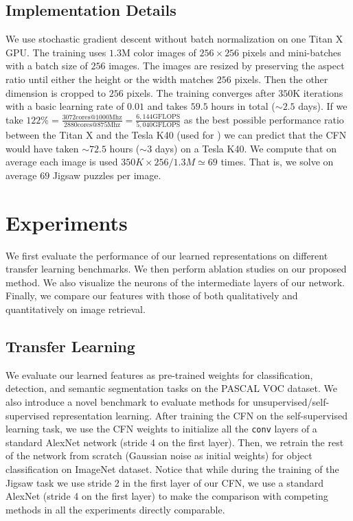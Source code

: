 \documentclass[runningheads]{llncs}
\begin{document}
\subsection{Implementation Details}

We use stochastic gradient descent without batch normalization \cite{batch_normalization} on one Titan X GPU. The training uses $1.3$M color images of $256\times 256$ pixels and mini-batches with a batch size of $256$ images. The images are resized by preserving the aspect ratio until either the height or the width matches $256$ pixels. Then the other dimension is cropped to $256$ pixels. The training converges after $350$K iterations with a basic learning rate of $0.01$ and takes $59.5$ hours in total ($\sim 2.5$ days). If we take $122\%= \frac{3072\text{cores}@1000\text{Mhz}}{2880 \text{cores} @875\text{Mhz}}=\frac{6,144\text{GFLOPS}}{5,040\text{GFLOPS}}$ as the best possible performance ratio between the Titan X and the Tesla K40 (used for \cite{Carl2015}) we can predict that the CFN would have taken $\sim 72.5$ hours ($\sim 3$ days) on a Tesla K40.
We compute that on average each image is used $350K \times 256 / 1.3M \simeq 69$ times. That is, we solve on average $69$ Jigsaw puzzles per image.


\section{Experiments}
We first evaluate the performance of our learned representations on different transfer learning benchmarks. We then perform ablation studies on our proposed method. We also visualize the neurons of the intermediate layers of our network. Finally, we compare our features with those of \cite{Carl2015,Gupta15} both qualitatively and quantitatively on image retrieval.

\subsection{Transfer Learning}
We evaluate our learned features as pre-trained weights for classification, detection, and semantic segmentation tasks on the PASCAL VOC dataset\cite{voc}.
We also introduce a novel benchmark to evaluate methods for unsupervised/self-supervised representation learning. 
After training the CFN on the self-supervised learning task, we use the CFN weights to initialize all the \texttt{conv} layers of a standard AlexNet network (stride 4 on the first layer). Then, we retrain the rest of the network from scratch (Gaussian noise as initial weights) for object classification on ImageNet dataset. Notice that while during the training of the Jigsaw task we use stride 2 in the first layer of our CFN, we use a standard AlexNet (stride 4 on the first layer) to make the comparison with competing methods in all the experiments directly comparable. 
\end{document}
